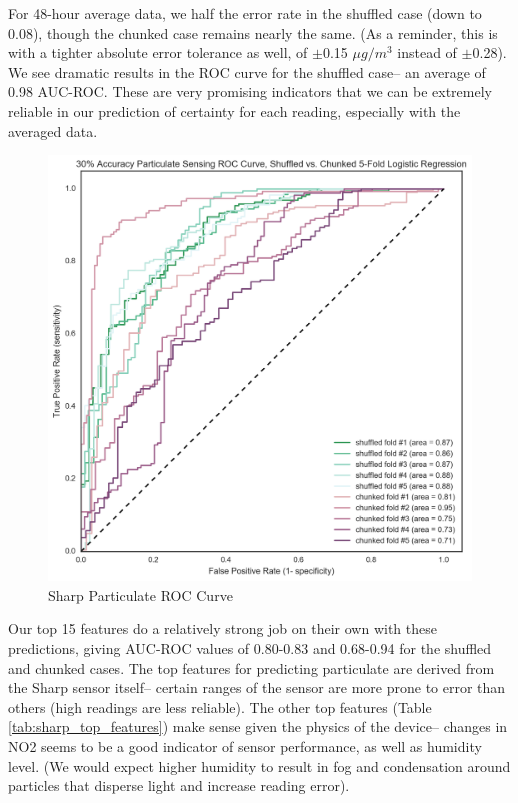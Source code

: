 For 48-hour average data, we half the error rate in the shuffled case (down to 0.08), though the chunked case remains nearly the same.  (As a reminder, this is with a tighter absolute error tolerance as well, of $\pm$0.15 $\mu g/m^3$ instead of $\pm$0.28). We see dramatic results in the ROC curve for the shuffled case-- an average of 0.98 AUC-ROC.  These are very promising indicators that we can be extremely reliable in our prediction of certainty for each reading, especially with the averaged data.

\begin{figure}[htb]
 	\includegraphics[width=\textwidth]{figs/sharp_goals_30_roc}               
 	 \caption{Sharp Particulate ROC Curve}
  	\label{fig:sharp_30_roc}
\end{figure}

Our top 15 features do a relatively strong job on their own with these predictions, giving AUC-ROC values of 0.80-0.83 and 0.68-0.94 for the shuffled and chunked cases.  The top features for predicting particulate are derived from the Sharp sensor itself-- certain ranges of the sensor are more prone to error than others (high readings are less reliable).  The other top features (Table \ref{tab:sharp_top_features}) make sense given the physics of the device-- changes in NO2 seems to be a good indicator of sensor performance, as well as humidity level. (We would expect higher humidity to result in fog and condensation around particles that disperse light and increase reading error).  

